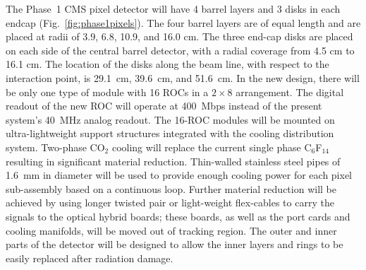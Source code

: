 The Phase~1 CMS pixel detector will have 4 barrel layers and 3 disks
in each endcap (Fig.~\ref{fig:phase1pixels}). The four barrel layers
are of equal length and are placed at radii of 3.9, 6.8, 10.9, and
16.0 cm. The three end-cap disks are placed on each side of the
central barrel detector, with a radial coverage from 4.5 cm to 16.1
cm.  The location of the disks along the beam line, with respect to
the interaction point, is 29.1~cm, 39.6~cm, and 51.6~cm. In the new
design, there will be only one type of module with 16 ROCs in a
$2\times 8$ arrangement. The digital readout of the new ROC will
operate at 400~Mbps instead of the present system's 40~MHz analog
readout. The 16-ROC modules will be mounted on ultra-lightweight
support structures integrated with the cooling distribution
system. Two-phase CO$_2$ cooling will replace the current single phase
C$_6$F$_{14}$ resulting in significant material reduction. Thin-walled
stainless steel pipes of 1.6~mm in diameter will be used to provide
enough cooling power for each pixel sub-assembly based on a continuous
loop. Further material reduction will be achieved by using longer
twisted pair or light-weight flex-cables to carry the signals to the
optical hybrid boards; these boards, as well as the port cards and
cooling manifolds, will be moved out of tracking region. The outer and
inner parts of the detector will be designed to allow the inner layers
and rings to be easily replaced after radiation damage.




